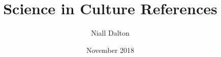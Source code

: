 \documentclass{article}
\title{Science in Culture References}
\author{Niall Dalton}
\date{November 2018}
\begin{document}
\maketitle

\nocite{*}


\end{document}
